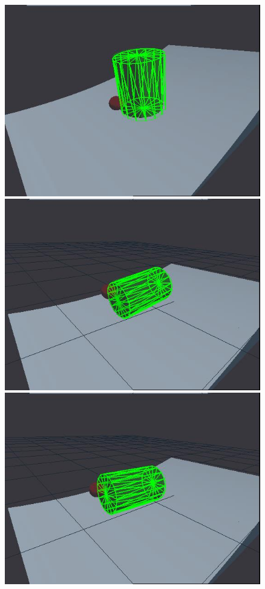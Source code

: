 \begin{figure}[htbp]
{}
\centerline{
\includegraphics[width=\imgwid]{./A00150}
\includegraphics[width=\imgwid]{./B00400}
\includegraphics[width=\imgwid]{./C01050}
}
\end{figure}
